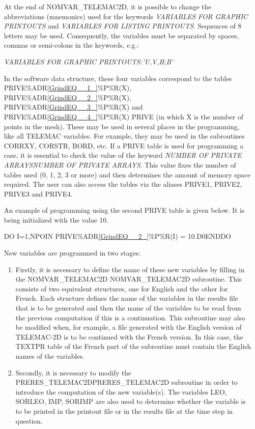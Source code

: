 \documentclass{article} %
\begin{document}
 At the end of NOMVAR\_TELEMAC2D, it is possible to change the abbreviations (mnemonics) used for the keywords \textit{VARIABLES FOR GRAPHIC PRINTOUTS} and \textit{VARIABLES FOR LISTING PRINTOUTS}. Sequences of 8 letters may be used. Consequently, the variables must be separated by spaces, commas or semi-colons in the keywords, e.g.:

 \textit{VARIABLES FOR GRAPHIC PRINTOUTS:'U,V,H;B'}

 In the software data structure, these four variables correspond to the tables PRIVE\%ADR\eqref{GrindEQ__1_}\%P\%R(X), PRIVE\%ADR\eqref{GrindEQ__2_}\%P\%R(X), PRIVE\%ADR\eqref{GrindEQ__3_}\%P\%R(X) and PRIVE\%ADR\eqref{GrindEQ__4_}\%P\%R(X) PRIVE (in which X is the number of points in the mesh). These may be used in several places in the programming, like all TELEMAC variables. For example, they may be used in the subroutines CORRXY, CORSTR, BORD, etc. If a PRIVE table is used for programming a case, it is essential to check the value of the keyword \textit{NUMBER OF PRIVATE ARRAYSNUMBER OF PRIVATE ARRAYS}. This value fixes the number of tables used (0, 1, 2, 3 or more) and then determines the amount of memory space required. The user can also access the tables via the aliases PRIVE1, PRIVE2, PRIVE3 and PRIVE4.

 An example of programming using the second PRIVE table is given below. It is being initialized with the value 10.

 DO I=1,NPOIN   PRIVE\%ADR\eqref{GrindEQ__2_}\%P\%R(I) = 10.D0ENDDO

 New variables are programmed in two stages:

\begin{enumerate}
\item  Firstly, it is necessary to define the name of these new variables by filling in the NOMVAR\_TELEMAC2D NOMVAR\_TELEMAC2D subroutine. This consists of two equivalent structures, one for English and the other for French. Each structure defines the name of the variables in the results file that is to be generated and then the name of the variables to be read from the previous computation if this is a continuation. This subroutine may also be modified when, for example, a file generated with the English version of TELEMAC-2D  is to be continued with the French version. In this case, the TEXTPR table of the French part of the subroutine must contain the English names of the variables.

\item  Secondly, it is necessary to modify the PRERES\_TELEMAC2DPRERES\_TELEMAC2D subroutine in order to introduce the computation of the new variable(s). The variables LEO, SORLEO, IMP, SORIMP are also used to determine whether the variable is to be printed in the printout file or in the results file at the time step in question.
\end{enumerate}
\end{document}
